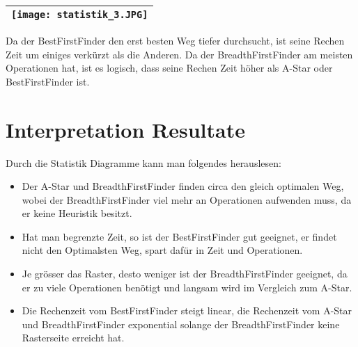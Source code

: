 \begin{longtable}[]{@{}l@{}}
\toprule
\endhead
\texttt{[image: statistik\_3.JPG]}\tabularnewline
\bottomrule
\end{longtable}

Da der BestFirstFinder den erst besten Weg tiefer durchsucht, ist seine
Rechen Zeit um einiges verkürzt als die Anderen. Da der
BreadthFirstFinder am meisten Operationen hat, ist es logisch, dass
seine Rechen Zeit höher als A-Star oder BestFirstFinder ist.

\section{Interpretation Resultate}

Durch die Statistik Diagramme kann man folgendes herauslesen:

\begin{itemize}
\item
  Der A-Star und BreadthFirstFinder finden circa den gleich optimalen Weg,
  wobei der BreadthFirstFinder viel mehr an Operationen aufwenden muss,
  da er keine Heuristik besitzt.
\item
  Hat man begrenzte Zeit, so ist der BestFirstFinder gut geeignet, er
  findet nicht den Optimalsten Weg, spart dafür in Zeit und Operationen.
\item
  Je grösser das Raster, desto weniger ist der BreadthFirstFinder
  geeignet, da er zu viele Operationen benötigt und langsam wird im
  Vergleich zum A-Star.
\item
  Die Rechenzeit vom BestFirstFinder steigt linear, die Rechenzeit vom
  A-Star und BreadthFirstFinder exponential solange der
  BreadthFirstFinder keine Rasterseite erreicht hat.
\end{itemize}


